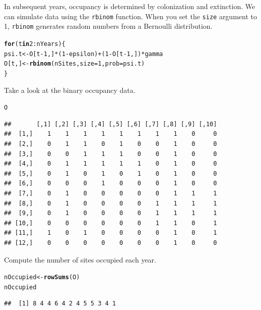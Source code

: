 \documentclass[12pt]{article}\usepackage[]{graphicx}\usepackage[]{color}
\makeatletter
\newcommand{\hlnum}[1]{\textcolor[rgb]{0.686,0.059,0.569}{#1}}%
\newcommand{\hlopt}[1]{\textcolor[rgb]{0,0,0}{#1}}%
\newcommand{\hlstd}[1]{\textcolor[rgb]{0.345,0.345,0.345}{#1}}%
\newcommand{\hlkwa}[1]{\textcolor[rgb]{0.161,0.373,0.58}{\textbf{#1}}}%
\newcommand{\hlkwb}[1]{\textcolor[rgb]{0.69,0.353,0.396}{#1}}%
\newcommand{\hlkwc}[1]{\textcolor[rgb]{0.333,0.667,0.333}{#1}}%
\newcommand{\hlkwd}[1]{\textcolor[rgb]{0.737,0.353,0.396}{\textbf{#1}}}%
\newenvironment{kframe}{%
 \def\at@end@of@kframe{}%
 \ifinner\ifhmode%
  \def\at@end@of@kframe{\end{minipage}}%
  \begin{minipage}{\columnwidth}%
 \fi\fi%
 \def\FrameCommand##1{\hskip\@totalleftmargin \hskip-\fboxsep
 \colorbox{shadecolor}{##1}\hskip-\fboxsep
     \hskip-\linewidth \hskip-\@totalleftmargin \hskip\columnwidth}%
 \MakeFramed {\advance\hsize-\width
   \@totalleftmargin\z@ \linewidth\hsize
   \@setminipage}}%
 {\par\unskip\endMakeFramed%
 \at@end@of@kframe}
\newenvironment{knitrout}{}{} %
\makeatother
\begin{document}
In subsequent years, occupancy is determined by colonization and
extinction. We can simulate data using the {\tt rbinom}
function. When you set the {\tt size} argument to 1, {\tt rbinom}
generates random numbers from a Bernoulli distribution.
\begin{knitrout}
\color{fgcolor}\begin{kframe}
\begin{alltt}
\hlkwa{for}\hlstd{(t} \hlkwa{in} \hlnum{2}\hlopt{:}\hlstd{nYears) \{}
    \hlstd{psi.t} \hlkwb{<-} \hlstd{O[t}\hlopt{-}\hlnum{1}\hlstd{,]}\hlopt{*}\hlstd{(}\hlnum{1}\hlopt{-}\hlstd{epsilon)} \hlopt{+} \hlstd{(}\hlnum{1}\hlopt{-}\hlstd{O[t}\hlopt{-}\hlnum{1}\hlstd{,])}\hlopt{*}\hlstd{gamma}
    \hlstd{O[t,]} \hlkwb{<-} \hlkwd{rbinom}\hlstd{(nSites,} \hlkwc{size}\hlstd{=}\hlnum{1}\hlstd{,} \hlkwc{prob}\hlstd{=psi.t)}
\hlstd{\}}
\end{alltt}
\end{kframe}
\end{knitrout}

Take a look at the binary occupancy data.
\begin{knitrout}
\color{fgcolor}\begin{kframe}
\begin{alltt}
\hlstd{O}
\end{alltt}
\begin{verbatim}
##       [,1] [,2] [,3] [,4] [,5] [,6] [,7] [,8] [,9] [,10]
##  [1,]    1    1    1    1    1    1    1    1    0     0
##  [2,]    0    1    1    0    1    0    0    1    0     0
##  [3,]    0    0    1    1    1    0    0    1    0     0
##  [4,]    0    1    1    1    1    1    0    1    0     0
##  [5,]    0    1    0    1    0    1    0    1    0     0
##  [6,]    0    0    0    1    0    0    0    1    0     0
##  [7,]    0    1    0    0    0    0    0    1    1     1
##  [8,]    0    1    0    0    0    0    1    1    1     1
##  [9,]    0    1    0    0    0    0    1    1    1     1
## [10,]    0    0    0    0    0    0    1    1    0     1
## [11,]    1    0    1    0    0    0    0    1    0     1
## [12,]    0    0    0    0    0    0    0    1    0     0
\end{verbatim}
\end{kframe}
\end{knitrout}

Compute the number of sites occupied each year.
\begin{knitrout}
\color{fgcolor}\begin{kframe}
\begin{alltt}
\hlstd{nOccupied} \hlkwb{<-} \hlkwd{rowSums}\hlstd{(O)}
\hlstd{nOccupied}
\end{alltt}
\begin{verbatim}
##  [1] 8 4 4 6 4 2 4 5 5 3 4 1
\end{verbatim}
\end{kframe}
\end{knitrout}
\end{document}
